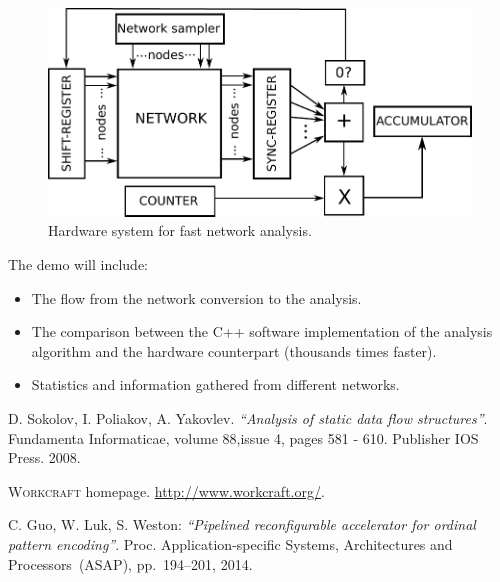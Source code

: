 \documentclass[conference]{IEEEtran}
\begin{document}
\begin{figure}[ht!]
\vspace{-3mm}
\begin{center}
	\includegraphics[width=\linewidth]{FIG/fantasi+.pdf}
	\caption{Hardware system for fast network analysis.}
	\label{fig:fantasi}
\end{center}
\vspace{-5mm}
\end{figure}
\noindent
The demo will include:
\begin{itemize}
\item The flow from the network conversion to the analysis.
\item The comparison between the C++ software implementation of the analysis algorithm and the hardware counterpart (thousands times faster).
\item Statistics and information gathered from different networks.
\end{itemize}

\begin{thebibliography}{3}

	D. Sokolov, I. Poliakov, A. Yakovlev. \emph{``Analysis of static data flow structures''}.
	Fundamenta Informaticae, volume 88,issue 4, pages 581 - 610. Publisher IOS Press. 2008.

	\textsc{Workcraft} homepage. \url{http://www.workcraft.org/}.	

	C. Guo, W. Luk, S. Weston:
	\emph{``Pipelined reconfigurable accelerator for ordinal pattern encoding''}.
	Proc. Application-specific Systems, Architectures and Processors~(ASAP),
	pp.~194--201, 2014.

\end{thebibliography}
\end{document}
